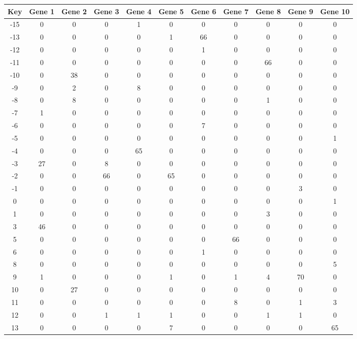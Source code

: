 \begin{tabular}{|c|c|c|c|c|c|c|c|c|c|c|}
\hline
Key & Gene 1 & Gene 2 & Gene 3 & Gene 4 & Gene 5 & Gene 6 & Gene 7 & Gene 8 & Gene 9 & Gene 10 \\
\hline
-15 & 0 & 0 & 0 & 1 & 0 & 0 & 0 & 0 & 0 & 0 \\
-13 & 0 & 0 & 0 & 0 & 1 & 66 & 0 & 0 & 0 & 0 \\
-12 & 0 & 0 & 0 & 0 & 0 & 1 & 0 & 0 & 0 & 0 \\
-11 & 0 & 0 & 0 & 0 & 0 & 0 & 0 & 66 & 0 & 0 \\
-10 & 0 & 38 & 0 & 0 & 0 & 0 & 0 & 0 & 0 & 0 \\
-9 & 0 & 2 & 0 & 8 & 0 & 0 & 0 & 0 & 0 & 0 \\
-8 & 0 & 8 & 0 & 0 & 0 & 0 & 0 & 1 & 0 & 0 \\
-7 & 1 & 0 & 0 & 0 & 0 & 0 & 0 & 0 & 0 & 0 \\
-6 & 0 & 0 & 0 & 0 & 0 & 7 & 0 & 0 & 0 & 0 \\
-5 & 0 & 0 & 0 & 0 & 0 & 0 & 0 & 0 & 0 & 1 \\
-4 & 0 & 0 & 0 & 65 & 0 & 0 & 0 & 0 & 0 & 0 \\
-3 & 27 & 0 & 8 & 0 & 0 & 0 & 0 & 0 & 0 & 0 \\
-2 & 0 & 0 & 66 & 0 & 65 & 0 & 0 & 0 & 0 & 0 \\
-1 & 0 & 0 & 0 & 0 & 0 & 0 & 0 & 0 & 3 & 0 \\
0 & 0 & 0 & 0 & 0 & 0 & 0 & 0 & 0 & 0 & 1 \\
1 & 0 & 0 & 0 & 0 & 0 & 0 & 0 & 3 & 0 & 0 \\
3 & 46 & 0 & 0 & 0 & 0 & 0 & 0 & 0 & 0 & 0 \\
5 & 0 & 0 & 0 & 0 & 0 & 0 & 66 & 0 & 0 & 0 \\
6 & 0 & 0 & 0 & 0 & 0 & 1 & 0 & 0 & 0 & 0 \\
8 & 0 & 0 & 0 & 0 & 0 & 0 & 0 & 0 & 0 & 5 \\
9 & 1 & 0 & 0 & 0 & 1 & 0 & 1 & 4 & 70 & 0 \\
10 & 0 & 27 & 0 & 0 & 0 & 0 & 0 & 0 & 0 & 0 \\
11 & 0 & 0 & 0 & 0 & 0 & 0 & 8 & 0 & 1 & 3 \\
12 & 0 & 0 & 1 & 1 & 1 & 0 & 0 & 1 & 1 & 0 \\
13 & 0 & 0 & 0 & 0 & 7 & 0 & 0 & 0 & 0 & 65 \\
\hline
\end{tabular}